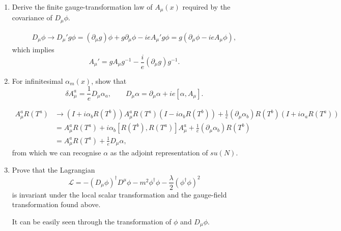 \begin{enumerate}[label=\alph*),resume]
    \item Derive the finite gauge-transformation law of $A_\mu(x)$ required by
    the covariance of $D_\mu\phi$.
    \begin{solution}
        \begin{equation}
            \begin{aligned}
                D_\mu \phi \to D_\mu' g \phi = (\partial_\mu g)\phi + g \partial_\mu \phi  - ie A_\mu' g\phi = g(\partial_\mu \phi - ie A_\mu \phi),
        \end{aligned}
        \end{equation}
        which implies
        \begin{equation}
            A_\mu' = g A_\mu g^{-1} - \frac{i}{e}(\partial_\mu g) g^{-1}.
        \end{equation}
    \end{solution}

    \item For infinitesimal $\alpha_m(x)$, show that
    \begin{equation}
        \delta A_\mu^a=\frac{1}{e}D_\mu\alpha_a,
        \qquad
        D_\mu\alpha=\partial_\mu\alpha+ie[\alpha,A_\mu].
    \end{equation}
    \begin{solution}
        \begin{equation}
            \begin{aligned}
                A_\mu^aR(T^a) & \to (I + i \alpha_bR(T^b))A_\mu^a R(T^a)(I - i \alpha_bR(T^b)) + \frac{1}{e}(\partial_\mu \alpha_b)R(T^b)(I + i \alpha_a R(T^a))\\
                &=A_\mu^aR(T^a) + i\alpha_b[R(T^b),R(T^a)]A_\mu^a+\frac{1}{e}(\partial_\mu \alpha_b)R(T^b)\\
                &=A_\mu^aR(T^a) + \frac{1}{e}D_\mu\alpha,
            \end{aligned}
        \end{equation}
        from which we can recognise $\alpha$ as the adjoint representation of $su(N)$.
    \end{solution}

    \item Prove that the Lagrangian
    \begin{equation}
        \mathcal{L}
        =-(D_\mu\phi)^\dagger D^\mu\phi
        -m^2\phi^\dagger\phi
        -\frac{\lambda}{2}(\phi^\dagger\phi)^2
    \end{equation}
    is invariant under the local scalar transformation and the gauge-field
    transformation found above.
    \begin{solution}
        It can be easily seen through the transformation of $\phi$ and $D_\mu \phi$.
    \end{solution}


\end{enumerate}
